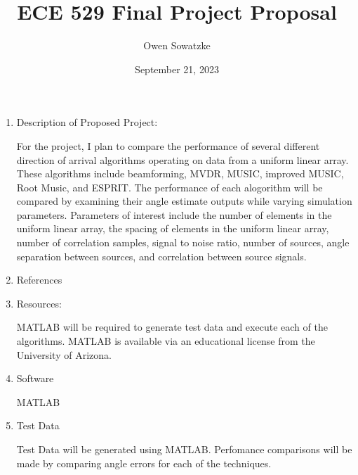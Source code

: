\documentclass{article}
\title{ECE 529 Final Project Proposal}
\author{Owen Sowatzke}
\date{September 21, 2023}
\begin{document}
	\maketitle
	
	\begin{enumerate}
		\item Description of Proposed Project:
		
			For the project, I plan to compare the performance of several different direction of arrival algorithms operating on data from a uniform linear array. These algorithms include beamforming, MVDR, MUSIC, improved MUSIC, Root Music, and ESPRIT. The performance of each alogorithm will be compared by examining their angle estimate outputs while varying simulation parameters. Parameters of interest include the number of elements in the uniform linear array, the spacing of elements in the uniform linear array, number of correlation samples, signal to noise ratio, number of sources, angle separation between sources, and correlation between source signals. 
			
		\item References
		
		\item Resources:
		
			MATLAB will be required to generate test data and execute each of the algorithms. MATLAB is available via an educational license from the University of Arizona.
			
		\item Software
		
			MATLAB
		
		\item Test Data	
			
			Test Data will be generated using MATLAB. Perfomance comparisons will be made by comparing angle errors for each of the techniques. 
	\end{enumerate}	 
\end{document}
